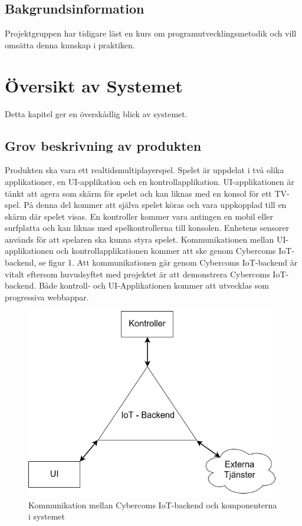 \documentclass[10pt]{article}
\begin{document}
	\subsection{Bakgrundsinformation}
		Projektgruppen har tidigare läst en kurs om programutvecklingsmetodik och vill omsätta denna kunskap i praktiken. 
		
\pagebreak
\section{Översikt av Systemet}
	Detta kapitel ger en överskådlig blick av systemet.

	\subsection{Grov beskrivning av produkten}
	Produkten ska vara ett realtidsmultiplayerspel. Spelet är uppdelat i två olika applikationer, en UI-applikation och en kontrollapplikation. UI-applikationen är tänkt att agera som skärm för spelet och kan liknas med en konsol för ett TV-spel. På denna del kommer att själva spelet köras och vara uppkopplad till en skärm där spelet visas. En kontroller kommer vara antingen en mobil eller surfplatta och kan liknas med spelkontrollerna till konsolen. Enhetens sensorer används för att spelaren ska kunna styra spelet. Kommunikationen mellan UI-applikationen och kontrollapplikationen kommer att ske genom Cybercoms IoT-backend, se figur 1. Att kommunikationen går genom Cybercoms IoT-backend är vitalt eftersom huvudsyftet med projektet är att demonstrera Cybercoms IoT-backend.  Både kontroll- och UI-Applikationen kommer att utvecklas som progressiva webbappar. 
	
	\begin{figure}[h]
		\centering
		\includegraphics[scale=0.4]{backend}
		\caption{Kommunikation mellan Cybercoms IoT-backend och komponenterna i systemet}
		\label{fig:backend}
	\end{figure}
	
\end{document}
